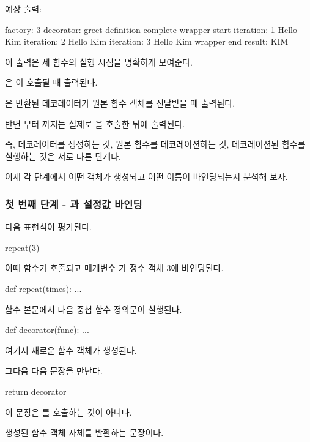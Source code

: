 예상 출력:

\begin{dhkzsh}
factory: 3
decorator: greet
definition complete
wrapper start
iteration: 1
Hello Kim
iteration: 2
Hello Kim
iteration: 3
Hello Kim
wrapper end
result: KIM
\end{dhkzsh}

이 출력은 세 함수의 실행 시점을 명확하게 보여준다.

은 이 호출될 때 출력된다.

은 반환된 데코레이터가 원본 함수 객체를 전달받을 때 출력된다.

반면 부터 까지는 실제로 을 호출한 뒤에 출력된다.

즉, 데코레이터를 생성하는 것, 원본 함수를 데코레이션하는 것, 데코레이션된 함수를 실행하는 것은 서로 다른 단계다.

이제 각 단계에서 어떤 객체가 생성되고 어떤 이름이 바인딩되는지 분석해 보자.

\subsubsection{첫 번째 단계 - 과 설정값 바인딩}

다음 표현식이 평가된다.

\begin{dhkcode}
repeat(3)
\end{dhkcode}

이때  함수가 호출되고 매개변수 가 정수 객체 3에 바인딩된다.

\begin{dhkcode}
def repeat(times):
    ...
\end{dhkcode}

함수 본문에서 다음 중첩 함수 정의문이 실행된다.

\begin{dhkcode}
def decorator(func):
    ...
\end{dhkcode}

여기서 새로운  함수 객체가 생성된다.

그다음 다음 문장을 만난다.

\begin{dhkcode}
return decorator
\end{dhkcode}

이 문장은 를 호출하는 것이 아니다.

생성된  함수 객체 자체를 반환하는 문장이다.

